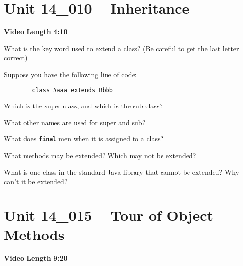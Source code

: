 \documentclass[letterpaper,12pt]{exam}
\newcommand{\unit}{Unit 14}
\begin{document}
\section*{\unit\_010 -- Inheritance} 
\par{\selectfont\textbf{Video Length 4:10 }}
\begin{questions}

\begin{samepage}
    \question What is the key word used to extend a class?  (Be careful to get the last letter correct)
    \vspace{5mm}
\end{samepage}

\begin{samepage}
    \question Suppose you have the following line of code:
    \begin{verbatim}
        class Aaaa extends Bbbb
    \end{verbatim}
        Which is the super class, and which is the sub class?
    \vspace{5mm}
\end{samepage}
\begin{samepage}
    \question What other names are used for super and sub?
    \vspace{5mm}
\end{samepage}

\begin{samepage}
    \question What does \texttt{\textbf{final}} men when it is assigned to a class?
    \vspace{5mm}
\end{samepage}

\begin{samepage}
    \question What methods may be extended?  Which may not be extended?
    \vspace{5mm}
\end{samepage}

\begin{samepage}
    \question What is one class in the standard Java library that cannot be extended?  Why can't it be extended?
    \vspace{5mm}
\end{samepage}


\section*{\unit\_015 -- Tour of Object Methods } 
\par{\selectfont\textbf{Video Length 9:20}}


\end{questions}
\end{document}

